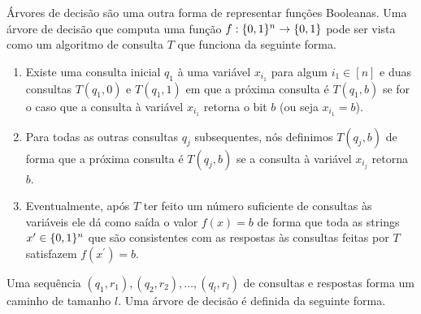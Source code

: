Árvores de decisão são uma outra forma de representar funções Booleanas. Uma árvore de decisão que computa uma função $f: \{0, 1\}^{n} \to \{0, 1\}$ pode ser vista como um algoritmo de consulta $T$ que funciona da seguinte forma.

\begin{enumerate}

    \item Existe uma consulta inicial $q_{1}$ à uma variável $x_{i_{1}}$ para algum $i_{1} \in [n]$ e duas consultas $T(q_{1}, 0)$ e $T(q_{1}, 1)$ em que a próxima consulta é $T(q_{1}, b)$ se for o caso que a consulta à variável $x_{i_{1}}$ retorna o bit $b$ (ou seja $x_{i_{1}} = b$).
    
    \item Para todas as outras consultas $q_{j}$ subsequentes, nós definimos $T(q_{j}, b)$ de forma que a próxima consulta é $T(q_{j}, b)$ se a consulta à variável $x_{i_{j}}$ retorna $b$.
    
    \item Eventualmente, após $T$ ter feito um número suficiente de consultas às variáveis ele dá como saída o valor $f(x) = b$ de forma que toda as strings $x^{\prime} \in \{0, 1\}^{n}$ que são consistentes com as respostas às consultas feitas por $T$ satisfazem $f(x^{\prime}) = b$.

\end{enumerate}

Uma sequência $(q_{1}, r_{1}), (q_{2}, r_{2}), \dots, (q_{l}, r_{l})$ de consultas e respostas forma um caminho de tamanho $l$. Uma árvore de decisão é definida da seguinte forma.


